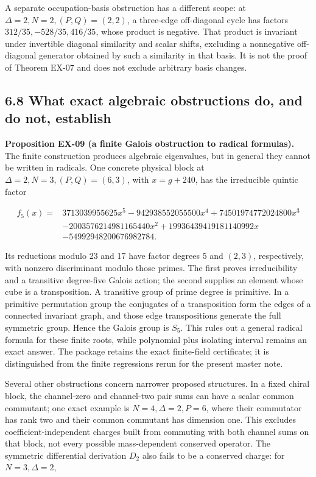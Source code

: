 A separate occupation-basis obstruction has a different scope: at \(\Delta=2,N=2,(P,Q)=(2,2)\), a three-edge off-diagonal cycle has factors \(312/35,-528/35,416/35\), whose product is negative. That product is invariant under invertible diagonal similarity and scalar shifts, excluding a nonnegative off-diagonal generator obtained by such a similarity in that basis. It is not the proof of Theorem EX-07 and does not exclude arbitrary basis changes.

\hypertarget{what-exact-algebraic-obstructions-do-and-do-not-establish}{%
\subsection{6.8 What exact algebraic obstructions do, and do not, establish}\label{what-exact-algebraic-obstructions-do-and-do-not-establish}}

\textbf{Proposition EX-09 (a finite Galois obstruction to radical formulas).} The finite construction produces algebraic eigenvalues, but in general they cannot be written in radicals. One concrete physical block at \(\Delta=2,N=3,(P,Q)=(6,3)\), with \(x=g+240\), has the irreducible quintic factor

\[
\begin{aligned}
f_5(x)={}&3713039955625x^5-942938552055500x^4
+74501974772024800x^3\\
&-2003576214981165440x^2
+19936439419181140992x\\
&-54992948200676982784.
\end{aligned}
\tag{6.56}
\]

Its reductions modulo 23 and 17 have factor degrees \(5\) and \((2,3)\), respectively, with nonzero discriminant modulo those primes. The first proves irreducibility and a transitive degree-five Galois action; the second supplies an element whose cube is a transposition. A transitive group of prime degree is primitive. In a primitive permutation group the conjugates of a transposition form the edges of a connected invariant graph, and those edge transpositions generate the full symmetric group. Hence the Galois group is \(S_5\). This rules out a general radical formula for these finite roots, while polynomial plus isolating interval remains an exact answer. The package retains the exact finite-field certificate; it is distinguished from the finite regressions rerun for the present master note.

Several other obstructions concern narrower proposed structures. In a fixed chiral block, the channel-zero and channel-two pair sums can have a scalar common commutant; one exact example is \(N=4,\Delta=2,P=6\), where their commutator has rank two and their common commutant has dimension one. This excludes coefficient-independent charges built from commuting with both channel sums on that block, not every possible mass-dependent conserved operator. The symmetric differential derivation \(D_2\) also fails to be a conserved charge: for \(N=3,\Delta=2\),

